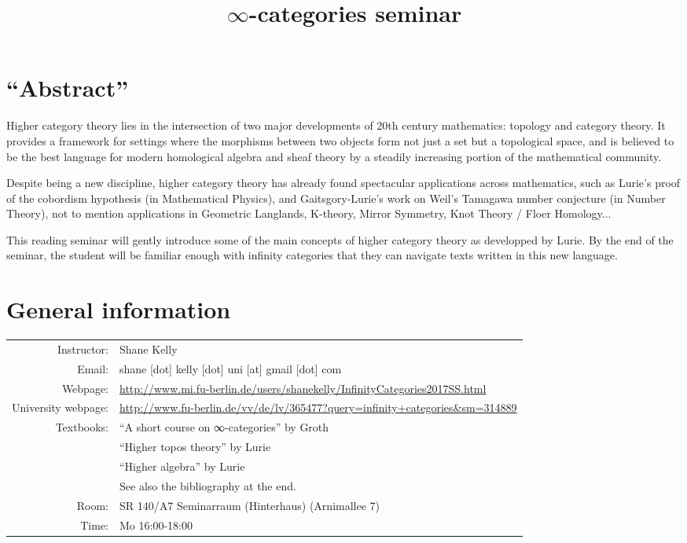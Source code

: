 \documentclass[a4paper]{amsart}
\title{$∞$-categories seminar}
\numberwithin{figure}{section}
\theoremstyle{theorem}
\theoremstyle{definition}
\begin{document}
\maketitle

\tableofcontents

\section*{``Abstract''}

Higher category theory lies in the intersection of two major developments of 20th century mathematics: topology and category theory. It provides a framework for settings where the morphisms between two objects form not just a set but a topological space, and is believed to be the best language for modern homological algebra and sheaf theory by a steadily increasing portion of the mathematical community.

Despite being a new discipline, higher category theory has already found spectacular applications across mathematics, such as Lurie's proof of the cobordism hypothesis (in Mathematical Physics), and Gaitsgory-Lurie's work on Weil's Tamagawa number conjecture (in Number Theory), not to mention applications in Geometric Langlands, K-theory, Mirror Symmetry, Knot Theory / Floer Homology...

This reading seminar will gently introduce some of the main concepts of higher category theory as developped by Lurie. By the end of the seminar, the student will be familiar enough with infinity categories that they can navigate texts written in this new language.

\section*{General information}

\begin{center}
\begin{tabular}{rl}
Instructor: & Shane Kelly \\
Email: & shane [dot] kelly [dot] uni [at] gmail [dot] com \\
Webpage: & {\footnotesize \url{http://www.mi.fu-berlin.de/users/shanekelly/InfinityCategories2017SS.html}} \\
University webpage: & {\footnotesize \url{http://www.fu-berlin.de/vv/de/lv/365477?query=infinity+categories\&sm=314889}} \\
Textbooks: 
& ``A short course on ∞-categories'' by Groth \\
& ``Higher topos theory'' by Lurie \\
& ``Higher algebra'' by Lurie \\
& See also the bibliography at the end. \\
Room: & SR 140/A7 Seminarraum (Hinterhaus) (Arnimallee 7) \\
Time: & Mo 16:00-18:00
\end{tabular}
\end{center}
\end{document}
